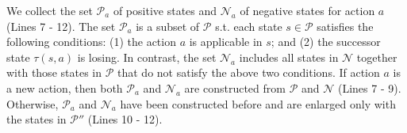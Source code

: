 \documentclass[review]{elsarticle}
\newcommand{\statevar}{\mathcal{X}}
\newcommand{\positiveSet}{\mathcal{P}}
\newcommand{\negativeSet}{\mathcal{N}}
\newcommand{\trans}{\mathcal{T}}
\newcommand{\suc}{\tau}
\begin{document}

We collect the set $\positiveSet_a$ of positive states and $\negativeSet_a$ of negative states for action $a$ (Lines 7 - 12).
The set $\positiveSet_a$ is a subset of $\positiveSet$ s.t. each state $s \in \positiveSet$ satisfies the following conditions: (1) the action $a$ is applicable in $s$; and
(2) the successor state $\suc(s, a)$ is losing.
In contrast, the set $\negativeSet_a$ includes all states in $\negativeSet$ together with those states in $\positiveSet$ that do not satisfy the above two conditions.
If action $a$ is a new action, then both $\positiveSet_a$ and $\negativeSet_a$ are constructed from $\positiveSet$ and $\negativeSet$ (Lines 7 - 9).
Otherwise, $\positiveSet_a$ and $\negativeSet_a$ have been constructed before and are enlarged only with the states in $\positiveSet''$ (Lines 10 - 12).
\end{document}
